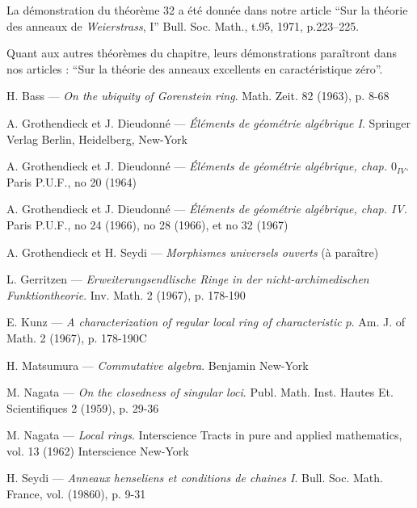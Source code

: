 {La démonstration du théorème 32 a été donnée dans notre article ``Sur la théorie des anneaux de \emph{Weierstrass}, I'' Bull. Soc. Math., t.95, 1971, p.223--225.

Quant aux autres théorèmes du chapitre, leurs démonstrations paraîtront dans nos articles : ``Sur la théorie des anneaux excellents en caractéristique zéro''.

\renewcommand{\bibname}{BIBLIOGRAPHIE}
\def\refname{B\MakeLowercase{IBLIOGRAPHIE}}
\begin{thebibliography}{99}\thispagestyle{empty}

  {\sc H. Bass} ---
  {\it On the ubiquity of Gorenstein ring}. Math. Zeit. 82 (1963), p. 8-68

  {\sc A. Grothendieck et J. Dieudonné} ---
  {\it Éléments de géométrie algébrique I}. Springer Verlag Berlin, Heidelberg, New-York

  {\sc A. Grothendieck et J. Dieudonné} ---
  {\it Éléments de géométrie algébrique, chap. $0_{IV}$}. Paris P.U.F., no 20 (1964)

  {\sc A. Grothendieck et J. Dieudonné} ---
  {\it Éléments de géométrie algébrique, chap. IV}. Paris P.U.F., no 24 (1966), no 28 (1966), et no 32 (1967)

  {\sc A. Grothendieck et H. Seydi} ---
  {\it Morphismes universels ouverts} (à paraître)

  {\sc L. Gerritzen} ---
  {\it Erweiterungsendlische Ringe in der nicht-archimedischen Funktiontheorie}. Inv. Math. 2 (1967), p. 178-190

  {\sc E. Kunz} ---
  {\it A characterization of regular local ring of characteristic $p$}. Am. J. of Math. 2 (1967), p. 178-190C

  {\sc H. Matsumura} ---
  {\it Commutative algebra}. Benjamin New-York

  {\sc M. Nagata} ---
  {\it On the closedness of singular loci}. Publ. Math. Inst. Hautes Et. Scientifiques 2 (1959), p. 29-36

  {\sc M. Nagata} ---
  {\it Local rings}. Interscience Tracts in pure and applied mathematics, vol. 13 (1962) Interscience New-York

  {\sc H. Seydi} ---
  {\it Anneaux henseliens et conditions de chaines I}. Bull. Soc. Math. France, vol. (19860), p. 9-31


\end{thebibliography}}
